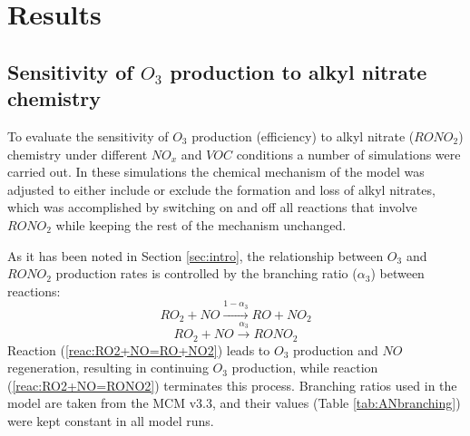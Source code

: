 \documentclass[11pt,a4paper]{article}
\begin{document}
\section{Results} \label{sec:res}
\subsection{Sensitivity of $O_3$ production to alkyl nitrate chemistry}

To evaluate the sensitivity of $O_3$ production (efficiency) to alkyl nitrate ($RONO_2$) chemistry under different $NO_x$ and $VOC$ conditions a number of simulations were carried out. In these simulations the chemical mechanism of the model was adjusted to either include or exclude the formation and loss of alkyl nitrates, which was accomplished by switching on and off all reactions that involve $RONO_2$ while keeping the rest of the mechanism unchanged. 

As it has been noted in Section \ref{sec:intro}, the relationship between $O_3$ and $RONO_2$ production rates is controlled by the branching ratio ($\alpha_3$) between reactions:
\begin{equation}\label{reac:RO2+NO=RO+NO2}
RO_2 + NO \xrightarrow{1-\alpha_3} RO + NO_2
\end{equation}
\begin{equation}\label{reac:RO2+NO=RONO2}
RO_2 + NO \xrightarrow{\alpha_3} RONO_2
\end{equation}
Reaction (\ref{reac:RO2+NO=RO+NO2}) leads to $O_3$ production and $NO$ regeneration, resulting in continuing $O_3$ production, while reaction (\ref{reac:RO2+NO=RONO2}) terminates this process. Branching ratios used in the model are taken from the MCM v3.3, and their values (Table \ref{tab:ANbranching}) were kept constant in all model runs.
\end{document}
